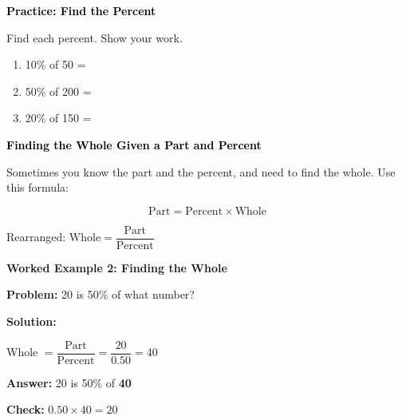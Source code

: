 \documentclass[12pt, letterpaper, fleqn]{article}
\newcommand{\blank}{\underline{\hspace{2.2cm}}}
\begin{document}
\vspace{4mm}

\begin{tcolorbox}[colback=customteal!20]
\large\textcolor{black}{\textbf{Practice: Find the Percent}}
\end{tcolorbox}

\noindent
Find each percent. Show your work.

\vspace{3mm}

\begin{enumerate}[itemsep=1.5cm, leftmargin=0.6cm]

\item 10\% of 50 = \blank

\item 50\% of 200 = \blank

\item 20\% of 150 = \blank

\end{enumerate}

\newpage

\begin{tcolorbox}[colback=customteal!20]
\large\textcolor{black}{\textbf{Finding the Whole Given a Part and Percent}}
\end{tcolorbox}

\noindent
Sometimes you know the part and the percent, and need to find the whole. Use this formula:

$$\text{Part} = \text{Percent} \times \text{Whole}$$
\vspace{2mm}

\noindent
Rearranged: $\text{Whole} = \dfrac{\text{Part}}{\text{Percent}}$

\vspace{3mm}

\begin{tcolorbox}[colback=white, colframe=black!25, boxrule=0.6pt, arc=4mm, left=6mm, right=6mm, top=5mm, bottom=5mm]

\textbf{Worked Example 2: Finding the Whole}

\medskip

\textbf{Problem:} 20 is 50\% of what number?

\medskip

\noindent
\textbf{Solution:}

\medskip

\noindent
Whole $= \dfrac{\text{Part}}{\text{Percent}} = \dfrac{20}{0.50} = 40$

\medskip

\noindent
\textbf{Answer:} 20 is 50\% of \textbf{40}

\medskip

\noindent
\textbf{Check:} $0.50 \times 40 = 20$ 

\end{tcolorbox}
\end{document}
